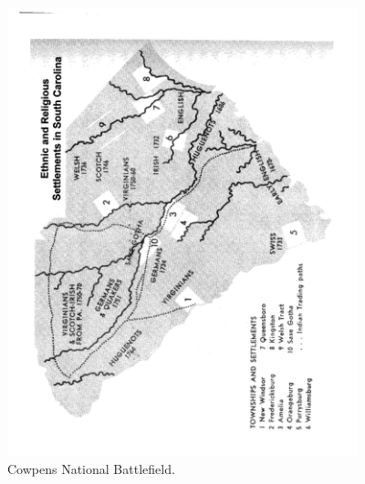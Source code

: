 \begin{figure}[h]
	\singlespacing
	\begin{center}
	  \includegraphics[angle=-90,width=4in]{gfx/rauch_battle_2007_02_p19}
	\end{center}
	\caption{Cowpens National Battlefield.}
	\label{cowppark97}
\end{figure}
\lipsum[6]
